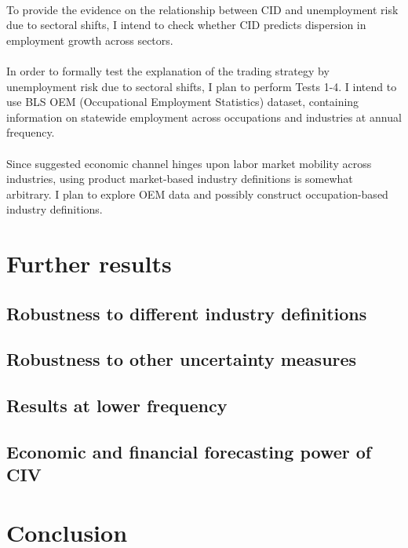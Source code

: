 \documentclass[12pt]{article}
\begin{document}
\paragraph{}
To provide the evidence on the relationship between CID and unemployment risk due to sectoral shifts, I intend to check whether CID predicts dispersion in employment growth across sectors.
\paragraph{}
In order to formally test the explanation of the trading strategy by unemployment risk due to sectoral shifts, I plan to perform Tests 1-4. I intend to use BLS OEM (Occupational Employment Statistics) dataset, containing information on statewide employment across occupations and industries at annual frequency. 
\paragraph{}
Since suggested economic channel hinges upon labor market mobility across industries, using product market-based industry definitions is somewhat arbitrary. I plan to explore OEM data and possibly construct occupation-based industry definitions.



\section{Further results} \label{sec:Model}
\subsection{Robustness to different industry definitions}
\subsection{Robustness to other uncertainty measures}
\subsection{Results at lower frequency}
\subsection{Economic and financial forecasting power of CIV}

\newpage

\section{Conclusion} \label{sec:Model}
\end{document}
